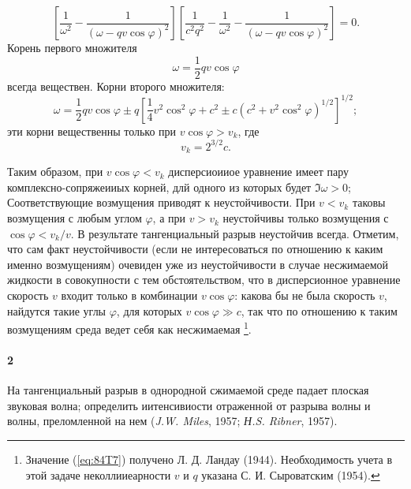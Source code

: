 \begin{equation}
    \label{eq:84T4}
    \left\lbrack \frac1{\omega^2} -  \frac1{(\omega - qv\cos\varphi)^2}\right\rbrack
    \left\lbrack \frac1{c^2q^2} - \frac1{\omega^2} -  \frac1{(\omega - qv\cos\varphi)^2}\right\rbrack
    = 0.
\end{equation}
Корень первого множителя
\begin{equation}
    \label{eq:84T5}
    \omega = \frac{1}{2}qv\cos\varphi
\end{equation}
всегда веществен. Корни второго множителя:
\begin{equation}
    \label{eq:84T6}
    \omega = \frac{1}{2}qv\cos\varphi\pm
    q \left\lbrack \frac{1}{4}v^2\cos^2\varphi+c^2 \pm c(c^2+v^2\cos^2\varphi)^{1/2}\right\rbrack^{1/2};
\end{equation}
эти корни вещественны только при $v\cos\varphi>v_k$, где
\begin{equation}
    \label{eq:84T7}
    v_k = 2^{3/2}c.
\end{equation}

Таким образом, при $v\cos\varphi<v_k$ дисперсиоииое уравнение имеет пару комплексно-сопряжеииых корней, длй одного из которых будет $\Im\omega>0$;
Соответствующие возмущения приводят к неустойчивости.
При $v<v_k$ таковы возмущения с любым углом $\varphi$, а при $v>v_k$ неустойчивы только возмущения с $\cos\varphi<v_k/v$.
В результате тангенциальный разрыв неустойчив всегда.
Отметим, что сам факт неустойчивости (если не интересоваться по отношению к каким именно возмущениям) очевиден уже из неустойчивости в случае несжимаемой жидкости в совокупности с тем обстоятельством, что в дисперсионное уравнение скорость $v$ входит только в комбинации $v\cos\varphi$:
какова бы не была скорость $v$, найдутся такие углы $\varphi$, для которых $v\cos\varphi\gg c$, так что по отношению к таким возмущениям среда ведет себя как несжимаемая
\footnote{Значение (\ref{eq:84T7}) получено Л. Д. Ландау (1944). Необходимость учета в этой задаче неколлииеарности $v$ и $q$ указана С. И. Сыроватским (1954).}.

\paragraph*{2} На тангенциальный разрыв в однородной сжимаемой среде падает плоская звуковая волна; определить иитенсивиости отраженной от разрыва волны и волны, преломленной на нем (\emph{J.W. Miles}, 1957; \emph{Н.S. Ribner}, 1957).

